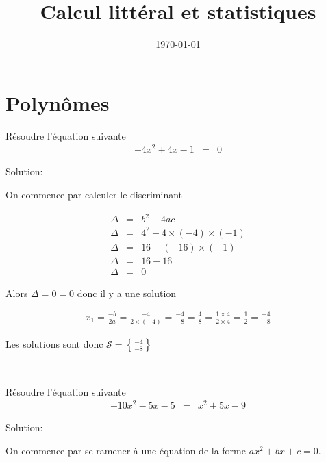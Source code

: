 \documentclass[a4paper,10pt]{article}
\title{Calcul littéral et statistiques}
\date{\today}
\begin{document}
\maketitle


\section{Polynômes}



    Résoudre l'équation suivante
    \begin{eqnarray*}
        - 4 x^{  2 } + 4 x - 1 & = & 0
    \end{eqnarray*}

    Solution:

    On commence par calculer le discriminant
    
    \begin{eqnarray*}
        \Delta & = & b^2-4ac \\
        \Delta & = & 4^{  2 } - 4 \times ( -4 ) \times ( -1 ) \\ 
\Delta & = & 16 - ( -16 ) \times ( -1 ) \\ 
\Delta & = & 16 - 16 \\ 
\Delta & = & 0
    \end{eqnarray*}
    

    
    Alors $\Delta = 0 = 0$ donc il y a une solution

    

    \begin{eqnarray*}
        x_1 = \frac{-b}{2a} = \frac{ -4 }{ 2 \times ( -4 ) } = \frac{ -4 }{ -8 } = \frac{ 4 }{ 8 } = \frac{ 1 \times 4 }{ 2 \times 4 } = \frac{ 1 }{ 2 } = \frac{ -4 }{ -8 }
    \end{eqnarray*}

    Les solutions sont donc $\mathcal{S} = \left\{ \frac{ -4 }{ -8 }\right\}$

    

    \bigskip
    ~\dotfill
    \bigskip
    
    
    
    
    Résoudre l'équation suivante
    \begin{eqnarray*}
        - 10 x^{  2 } - 5 x - 5 & = & x^{  2 } + 5 x - 9
    \end{eqnarray*}

    Solution:

    On commence par se ramener à une équation de la forme $ax^2+bx+c = 0$.
\end{document}

